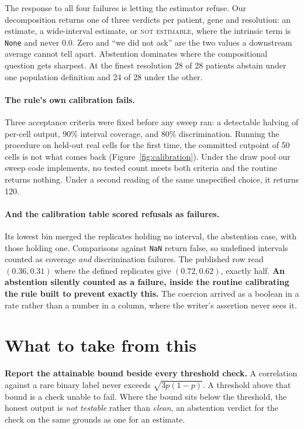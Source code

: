 \documentclass{article}
\newcommand{\notest}{\textsc{not estimable}}
\begin{document}
The response to all four failures is letting the estimator refuse. Our
decomposition returns one of three verdicts per patient, gene and resolution: an
estimate, a wide-interval estimate, or \notest{}, where the intrinsic term is
\texttt{None} and never $0.0$. Zero and ``we did not ask'' are the two values a
downstream average cannot tell apart. Abstention dominates where the
compositional question gets sharpest. At the finest resolution 28 of 28 patients
abstain under one population definition and 24 of 28 under the other.

\paragraph{The rule's own calibration fails.} Three acceptance criteria were
fixed before any sweep ran: a detectable halving of per-cell output, 90\%
interval coverage, and 80\% discrimination. Running the procedure on held-out
real cells for the first time, the committed cutpoint of 50 cells is not what
comes back (Figure~\ref{fig:calibration}). Under the draw pool our sweep code
implements, no tested count meets both criteria and the routine returns nothing.
Under a second reading of the same unspecified choice, it returns 120.

\paragraph{And the calibration table scored refusals as failures.} Its lowest bin
merged the replicates holding no interval, the abstention case, with those
holding one. Comparisons against \texttt{NaN} return false, so undefined
intervals counted as coverage \emph{and} discrimination failures. The published
row read $(0.36, 0.31)$ where the defined replicates give $(0.72, 0.62)$, exactly
half. \textbf{An abstention silently counted as a failure, inside the routine
calibrating the rule built to prevent exactly this.} The coercion arrived as a
boolean in a rate rather than a number in a column, where the writer's assertion
never sees it.

\section{What to take from this}
\label{sec:takeaways}

\textbf{Report the attainable bound beside every threshold check.} A correlation
against a rare binary label never exceeds $\sqrt{3p(1-p)}$. A threshold above
that bound is a check unable to fail. Where the bound sits below the threshold,
the honest output is \emph{not testable} rather than \emph{clean}, an abstention
verdict for the check on the same grounds as one for an estimate.
\end{document}
